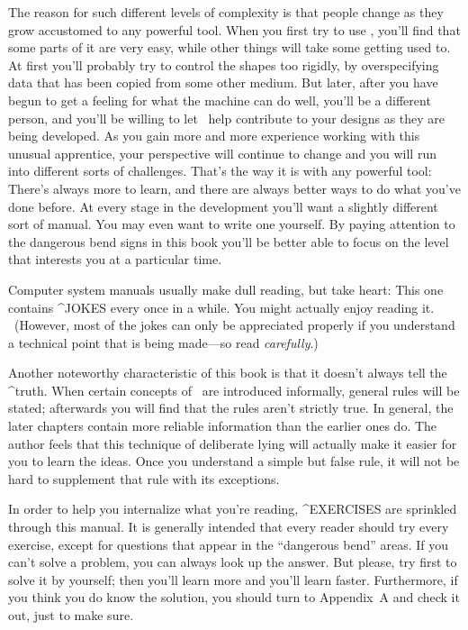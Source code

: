{The reason for such different levels of complexity is that people change
as they grow accustomed to any powerful tool. When you first try to use
\MF\!, you'll find that some parts of it are very easy, while other things
will take some getting used to. At first you'll probably try to control
the shapes too rigidly, by overspecifying data that has been copied from
some other medium.  But later, after you have begun to get a feeling for
what the machine can do well, you'll be a different person, and you'll be
willing to let \MF\ help contribute to your designs as they are being
developed. As you gain more and more experience working with this unusual
apprentice, your perspective will continue to change and you will
run into different sorts of challenges.  That's the way it is with any
powerful tool: There's always more to learn, and there are always better
ways to do what you've done before.  At every stage in the development
you'll want a slightly different sort of manual.  You may even want to
write one yourself.  By paying attention to the dangerous bend signs in
this book you'll be better able to focus on the level that interests you
at a particular time.

Computer system manuals usually make dull reading, but take heart:
This one contains {\sc ^{JOKES}} every once in a while. You might actually
enjoy reading it. \ (However, most of the jokes can only be appreciated
properly if you understand a technical point that is being made---so
read {\sl carefully}.)

Another noteworthy characteristic of this book is that it doesn't
always tell the ^{truth}. When certain concepts of \MF\ are introduced
informally, general rules will be stated; afterwards you will find that the
rules aren't strictly true. In general, the later chapters contain more
reliable information than the earlier ones do. The author feels that this
technique of deliberate lying will actually make it easier for you to
learn the ideas. Once you understand a simple but false rule, it will not
be hard to supplement that rule with its exceptions.

In order to help you internalize what you're reading,
{\sc ^{EXERCISES}} are sprinkled through this manual. It is generally intended
that every reader should try every exercise, except for questions that appear
in the ``dangerous bend'' areas. If you can't solve a problem, you
can always look up the answer.
But please, try first to solve it by yourself; then you'll learn more
and you'll learn faster. Furthermore, if you think you do know the solution,
you should turn to Appendix~A and check it out, just to make sure.

}

